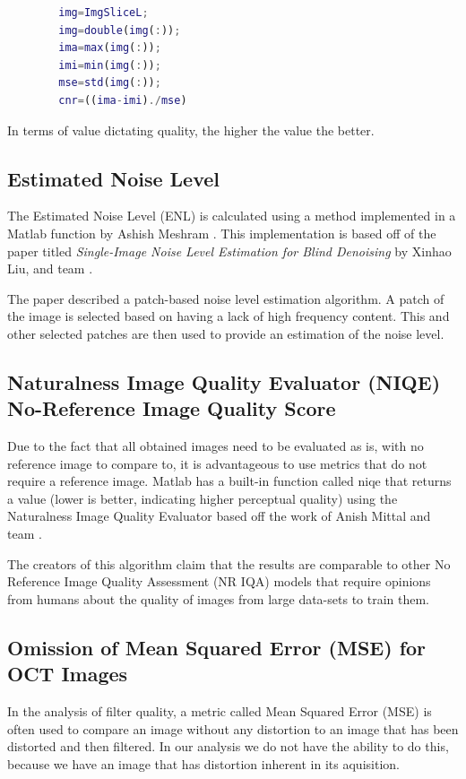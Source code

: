 \documentclass[%
reprint,
showpacs,preprintnumbers,
bibnotes,
amsmath,amssymb,
aps,
pra,
]{revtex4-1}
\begin{document}
		\begin{lstlisting}[language=Matlab, caption=Estimate Contrast to Noise Ratio, label=code:cnr]
		% Measure contrast-to-noise ratio
		img=ImgSliceL;
		img=double(img(:));
		ima=max(img(:));
		imi=min(img(:));
		mse=std(img(:));
		cnr=((ima-imi)./mse)
		\end{lstlisting}
	
		In terms of value dictating quality, the higher the value the better.
	\subsection{\label{sec:level2} Estimated Noise Level}
		The Estimated Noise Level (ENL) is calculated using a method implemented in a Matlab function by Ashish Meshram \cite{meshram_noise_2014}. This implementation is based off of the paper titled \textit{Single-Image Noise Level Estimation for Blind Denoising}  by Xinhao Liu, and team \cite{Liu_2013}.
		
		The paper described a patch-based noise level estimation algorithm. A patch of the image is selected based on having a lack of high frequency content. This and other selected patches are then used to provide an estimation of the noise level.
	\subsection{\label{sec:level2} Naturalness Image Quality Evaluator (NIQE) No-Reference Image Quality Score}
	
		Due to the fact that all obtained images need to be evaluated as is, with no reference image to compare to, it is advantageous to use metrics that do not require a reference image. Matlab has a built-in function called niqe that returns a value (lower is better, indicating higher perceptual quality) using the Naturalness Image Quality Evaluator based off the work of Anish Mittal and team \cite{NIQE_2013}.
		
		The creators of this algorithm claim that the results are comparable to other No Reference Image Quality Assessment (NR IQA) models that require opinions from humans about the quality of images from large data-sets to train them.
	
  	\subsection{\label{sec:level2} Omission of Mean Squared Error (MSE) for OCT Images}

	  	In the analysis of filter quality, a metric called Mean Squared Error (MSE) is often used to compare an image without any distortion to an image that has been distorted and then filtered. In our analysis we do not have the ability to do this, because we have an image that has distortion inherent in its aquisition.
	
\end{document}
